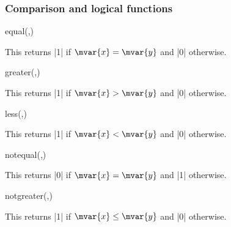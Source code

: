 \subsubsection{Comparison and logical functions}

\label{pgfmath-functions-comparison}

\begin{math-function}{equal(,)}
\mathcommand

	This returns |1| if $\mvar{x}=\mvar{y}$ and |0| otherwise.
	
\begin{codeexample}[]
 \pgfmathresult
\end{codeexample}

\end{math-function}

\begin{math-function}{greater(,)}
\mathcommand

	This returns |1| if $\mvar{x}>\mvar{y}$ and |0| otherwise.
	
\begin{codeexample}[]
 \pgfmathresult
\end{codeexample}

\end{math-function}

\begin{math-function}{less(,)}
\mathcommand

	This returns |1| if $\mvar{x}<\mvar{y}$ and |0| otherwise.
	
\begin{codeexample}[]
 \pgfmathresult
\end{codeexample}
\end{math-function}

\begin{math-function}{notequal(,)}
\mathcommand

	This returns |0| if $\mvar{x}=\mvar{y}$ and |1| otherwise.
	
\begin{codeexample}[]
 \pgfmathresult
\end{codeexample}

\end{math-function}

\begin{math-function}{notgreater(,)}
\mathcommand

	This returns |1| if $\mvar{x}\leq\mvar{y}$ and |0| otherwise.
	
\begin{codeexample}[]
 \pgfmathresult
\end{codeexample}
\end{math-function}

